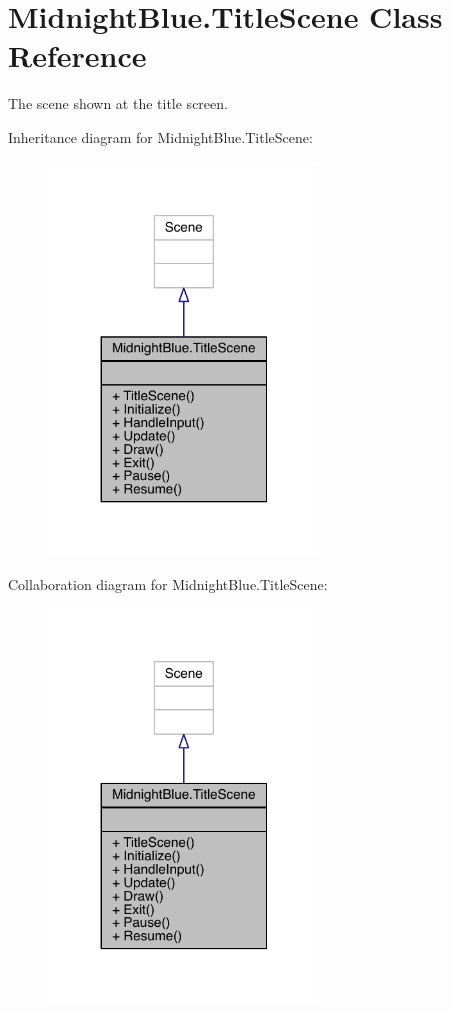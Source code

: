 \hypertarget{class_midnight_blue_1_1_title_scene}{}\section{Midnight\+Blue.\+Title\+Scene Class Reference}
\label{class_midnight_blue_1_1_title_scene}


The scene shown at the title screen.  




Inheritance diagram for Midnight\+Blue.\+Title\+Scene\+:
\nopagebreak
\begin{figure}[H]
\begin{center}
\leavevmode
\includegraphics[width=203pt]{class_midnight_blue_1_1_title_scene__inherit__graph}
\end{center}
\end{figure}


Collaboration diagram for Midnight\+Blue.\+Title\+Scene\+:
\nopagebreak
\begin{figure}[H]
\begin{center}
\leavevmode
\includegraphics[width=203pt]{class_midnight_blue_1_1_title_scene__coll__graph}
\end{center}
\end{figure}
